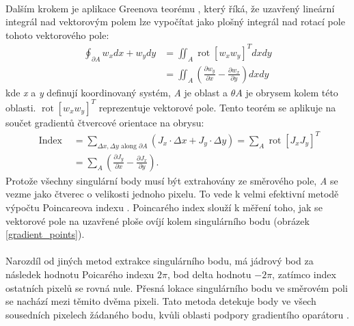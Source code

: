 \paragraph{}
Dalším krokem je aplikace Greenova teorému \cite{directional}, který říká, že uzavřený lineární integrál nad vektorovým polem lze vypočítat jako plošný integrál nad rotací pole tohoto vektorového pole:
\begin{equation}
\begin{aligned}
\oint_{\partial A} w_x d x+w_y d y & =\iint_A \operatorname{rot}\left[w_x w_y\right]^T d x d y \\
& =\iint_A\left(\frac{\partial w_y}{\partial x}-\frac{\partial w_x}{\partial y}\right) d x d y
\end{aligned}
\end{equation}
kde \textit{x} a \textit{y} definují koordinovaný systém, \textit{A} je oblast a \begin{math}\theta A\end{math} je obrysem kolem této oblasti. \begin{math}\operatorname{rot}\left[w_x w_y\right]^T\end{math} reprezentuje vektorové pole. Tento teorém se aplikuje na součet gradientů čtvercové orientace na obrysu:
\begin{equation}
\begin{aligned}
\text { Index } & =\sum_{\Delta x, \Delta y \text { along } \partial A}\left(J_x \cdot \Delta x+J_y \cdot \Delta y\right)=\sum_A \operatorname{rot}\left[J_x J_y\right]^T \\
& =\sum_A\left(\frac{\partial J_y}{\partial x}-\frac{\partial J_x}{\partial y}\right) .
\end{aligned}
\end{equation}
Protože všechny singulární body musí být extrahovány ze směrového pole, \textit{A} se vezme jako čtverec o velikosti jednoho pixelu. To vede k velmi efektivní metodě výpočtu Poincareova indexu \cite{directional}. Poincarého index \cite{poincare} slouží k měření toho, jak se vektorové pole na uzavřené ploše ovíjí kolem singulárního bodu (obrázek \ref{gradient_points}).

\paragraph{}
Narozdíl od jiných metod extrakce singulárního bodu, má jádrový bod za následek hodnotu Poicarého indexu \begin{math}2 \pi\end{math}, bod delta hodnotu \begin{math}- 2 \pi\end{math}, zatímco index ostatních pixelů se rovná nule. Přesná lokace singulárního bodu ve směrovém poli se nachází mezi těmito dvěma pixeli. Tato metoda detekuje body ve všech sousedních pixelech žádaného bodu, kvůli oblasti podpory gradientího oparátoru \cite{directional}.

